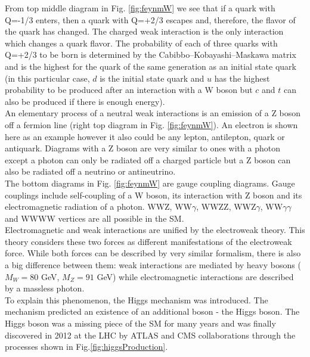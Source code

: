 From top middle diagram in Fig. \ref{fig:feynmW} we see that if a quark with Q=-1/3 enters, then a quark with Q=+2/3 escapes and, therefore, the flavor of the quark has changed. The charged weak interaction is the only interaction which changes a quark flavor. The probability of each of three quarks with Q=+2/3 to be born is determined by the Cabibbo–Kobayashi–Maskawa matrix and is the highest for the quark of the same generation as an initial state quark (in this particular case, $d$ is the initial state quark and $u$ has the highest probability to be produced after an interaction with a W boson but $c$ and $t$ can also be produced if there is enough energy).\\

An elementary process of a neutral weak interactions is an emission of a Z boson off a fermion line (right top diagram in Fig. \ref{fig:feynmW}). An electron is shown here as an example however it also could be any lepton, antilepton, quark or antiquark. Diagrams with a Z boson are very similar to ones with a photon except a photon can only be radiated off a charged particle but a Z boson can also be radiated off a neutrino or antineutrino.\\

The bottom diagrams in Fig. \ref{fig:feynmW} are gauge coupling diagrams. Gauge couplings include self-coupling of a W boson, its interaction with Z boson and its electromagnetic radiation of a photon. WWZ, WW$\gamma$, WWZZ, WWZ$\gamma$, WW$\gamma\gamma$ and WWWW vertices are all possible in the SM.\\

Electromagnetic and weak interactions are unified by the electroweak theory. This theory considers these two forces as different manifestations of the electroweak force. While both forces can be described by very similar formalism, there is also a big difference between them: weak interactions are mediated by heavy bosons ($M_W=80$ GeV, $M_Z=91$ GeV) while electromagnetic interactions are described by a massless photon. \\

To explain this phenomenon, the Higgs mechanism was introduced. The mechanism predicted an existence of an additional boson - the Higgs boson. The Higgs boson was a missing piece of the SM for many years and was finally discovered in 2012 at the LHC by ATLAS and CMS collaborations through the processes shown in Fig.\ref{fig:higgsProduction}.\\ 

